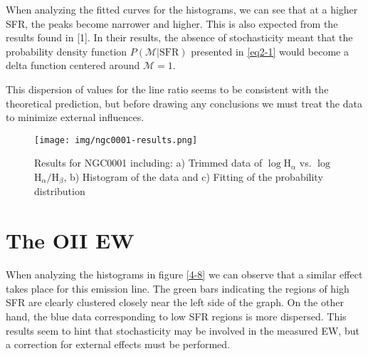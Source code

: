 When analyzing the fitted curves for the histograms, we can see that at a higher SFR, the peaks become narrower and higher. This is
also expected from the results found in [1]. In their results, the absence of stochasticity meant that the probability density
function $P\left(\mathcal{M}|\mathrm{SFR}\right)$ presented in \ref{eq2-1} would become a delta function centered around
$\mathcal{M}=1$.

This dispersion of values for the line ratio seems to be consistent with the theoretical prediction, but before drawing any
conclusions we must treat the data to minimize external influences.
\begin{figure}[t]
  \centering
  \texttt{[image: img/ngc0001-results.png]}
  \caption{Results for NGC0001 including: a) Trimmed data of $\log$H$_{\alpha}$ vs. $\log$H$_{\alpha}/$H$_{\beta}$,
  b) Histogram of the data and c) Fitting of the probability distribution}
\end{figure}

\section{The OII EW}

When analyzing the histograms in figure \ref{4-8} we can observe that a similar effect takes place for this emission line. The green
bars indicating the regions of high SFR are clearly clustered closely near the left side of the graph. On the other hand, the blue
data corresponding to low SFR regions is more dispersed. This results seem to hint that stochasticity may be involved in the
measured EW, but a correction for external effects must be performed.
